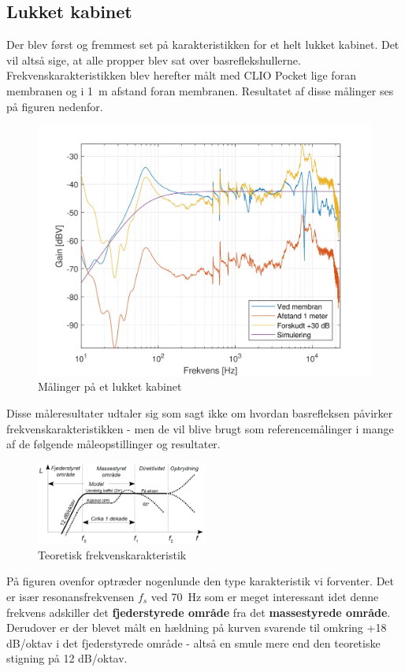 \newpage
\subsection{Lukket kabinet}
Der blev først og fremmest set på karakteristikken for et helt lukket kabinet. Det vil altså sige, at alle propper blev sat over basreflekshullerne. Frekvenskarakteristikken blev herefter målt med CLIO Pocket lige foran membranen og i \SI{1}{\meter} afstand foran membranen. Resultatet af disse målinger ses på figuren nedenfor.
\begin{figure}[H]
	\centering
	\vspace{-12pt}
	\includegraphics[width=\textwidth]{Billeder/Grafer/ClosedCabinet}
	\caption{Målinger på et lukket kabinet}
\end{figure}

Disse måleresultater udtaler sig som sagt ikke om hvordan basrefleksen påvirker frekvenskarakteristikken - men de vil blive brugt som referencemålinger i mange af de følgende måleopstillinger og resultater.

\begin{figure} 
	\vspace{-20pt}
	\begin{center}
		\includegraphics[width=0.5\textwidth]{Billeder/FrekvenskarakteristikTeori}
	\end{center}
	\vspace{-15pt}
	\caption{Teoretisk frekvenskarakteristik}
	\vspace{-20pt}
\end{figure}
På figuren ovenfor optræder nogenlunde den type karakteristik vi forventer. Det er især resonansfrekvensen $f_s$ ved \SI{70}{\hertz} som er meget interessant idet denne frekvens adskiller det \textbf{fjederstyrede område} fra det \textbf{massestyrede område}. Derudover er der blevet målt en hældning på kurven svarende til omkring +18 dB/oktav i det fjederstyrede område - altså en smule mere end den teoretiske stigning på 12 dB/oktav.

